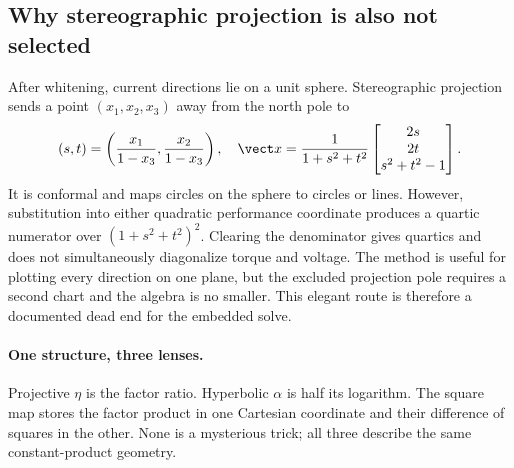 \subsection{Why stereographic projection is also not selected}

After whitening, current directions lie on a unit sphere. Stereographic
projection sends a point \((x_1,x_2,x_3)\) away from the north pole to
\begin{equation}
 (s,t)=\left(\frac{x_1}{1-x_3},\frac{x_2}{1-x_3}\right),
 \quad
 \vect x=\frac{1}{1+s^2+t^2}
 \begin{bmatrix}2s\\2t\\s^2+t^2-1\end{bmatrix}.
\end{equation}
It is conformal and maps circles on the sphere to circles or lines. However,
substitution into either quadratic performance coordinate produces a quartic
numerator over \((1+s^2+t^2)^2\). Clearing the denominator gives quartics and
does not simultaneously diagonalize torque and voltage. The method is useful
for plotting every direction on one plane, but the excluded projection pole
requires a second chart and the algebra is no smaller. This elegant route is
therefore a documented dead end for the embedded solve.

\paragraph{One structure, three lenses.}
Projective \(\eta\) is the factor ratio. Hyperbolic \(\alpha\) is half its
logarithm. The square map stores the factor product in one Cartesian
coordinate and their difference of squares in the other. None is a mysterious
trick; all three describe the same constant-product geometry.
